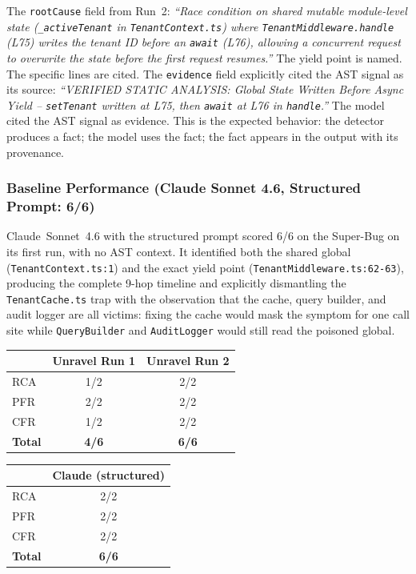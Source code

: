 \documentclass[12pt,a4paper]{article}
\newcommand{\code}[1]{\texttt{\small #1}}
\begin{document}
The \code{rootCause} field from Run~2: \textit{``Race condition on shared mutable
module-level state (\code{\_activeTenant} in \code{TenantContext.ts}) where
\code{TenantMiddleware.handle} (L75) writes the tenant ID before an \code{await} (L76),
allowing a concurrent request to overwrite the state before the first request resumes.''}
The yield point is named. The specific lines are cited. The \code{evidence} field
explicitly cited the AST signal as its source: \textit{``VERIFIED STATIC ANALYSIS:
Global State Written Before Async Yield -- \code{setTenant} written at L75, then
\code{await} at L76 in \code{handle}.''} The model cited the AST signal as evidence.
This is the expected behavior: the detector produces a fact; the model uses the fact;
the fact appears in the output with its provenance.

\subsubsection{Baseline Performance (Claude Sonnet 4.6, Structured Prompt: 6/6)}
\label{sec:superbug-claude}

Claude~Sonnet~4.6 with the structured prompt scored 6/6 on the Super-Bug on its
first run, with no AST context. It identified both the shared global (\code{TenantContext.ts:1})
and the exact yield point (\code{TenantMiddleware.ts:62-63}), producing the complete
9-hop timeline and explicitly dismantling the \code{TenantCache.ts} trap with the
observation that the cache, query builder, and audit logger are all victims: fixing the
cache would mask the symptom for one call site while \code{QueryBuilder} and
\code{AuditLogger} would still read the poisoned global.

\begin{center}\small
\begin{tabular}{@{}l cc@{}}
\toprule
& \textbf{Unravel Run 1} & \textbf{Unravel Run 2} \\
\midrule
RCA & 1/2 & 2/2 \\
PFR & 2/2 & 2/2 \\
CFR & 1/2 & 2/2 \\
\textbf{Total} & \textbf{4/6} & \textbf{6/6} \\
\bottomrule
\end{tabular}
\quad
\begin{tabular}{@{}l c@{}}
\toprule
& \textbf{Claude (structured)} \\
\midrule
RCA & 2/2 \\
PFR & 2/2 \\
CFR & 2/2 \\
\textbf{Total} & \textbf{6/6} \\
\bottomrule
\end{tabular}
\end{center}
\end{document}
